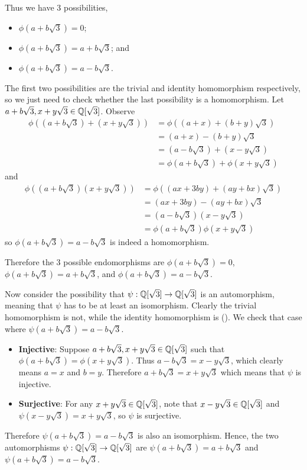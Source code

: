 \begin{questions}
    Thus we have 3 possibilities,
    \begin{itemize}
        \item $\phi(a+b\sqrt3) = 0$;
        \item $\phi(a+b\sqrt3) = a+b\sqrt3$; and
        \item $\phi(a+b\sqrt3) = a-b\sqrt3$.
    \end{itemize}
    The first two possibilities are the trivial and identity homomorphism respectively, so we just need to check whether the last possibility is a homomorphism. Let $a + b\sqrt3, x + y\sqrt3 \in \mathbb{Q}[\sqrt3]$. Observe
    \begin{align*}
        \phi((a+b\sqrt3) + (x+y\sqrt3)) &= \phi((a+x)+(b+y)\sqrt3)\\
        &= (a+x)-(b+y)\sqrt3\\
        &= (a-b\sqrt3) + (x-y\sqrt3)\\
        &= \phi(a+b\sqrt3) + \phi(x+y\sqrt3)
    \end{align*}
    and
    \begin{align*}
        \phi((a+b\sqrt3)(x+y\sqrt3)) &= \phi((ax+3by)+(ay+bx)\sqrt3)\\
        &= (ax+3by)-(ay+bx)\sqrt3\\
        &= (a-b\sqrt3)(x-y\sqrt3)\\
        &= \phi(a+b\sqrt3)\phi(x+y\sqrt3)
    \end{align*}
    so $\phi(a+b\sqrt3) = a-b\sqrt3$ is indeed a homomorphism.

    Therefore the 3 possible endomorphisms are $\phi(a+b\sqrt3) = 0$, $\phi(a+b\sqrt3) = a+b\sqrt3$, and $\phi(a+b\sqrt3) = a-b\sqrt3$.

    Now consider the possibility that $\psi: \mathbb{Q}[\sqrt3] \to \mathbb{Q}[\sqrt3]$ is an automorphism, meaning that $\psi$ has to be at least an isomorphism. Clearly the trivial homomorphism is not, while the identity homomorphism is (). We check that case where $\psi(a+b\sqrt3) = a-b\sqrt3$.
    \begin{itemize}
        \item \textbf{Injective}: Suppose $a+b\sqrt3, x+y\sqrt3 \in \mathbb{Q}[\sqrt3]$ such that $\phi(a+b\sqrt3) = \phi(x+y\sqrt3)$. Thus $a - b\sqrt3 = x - y\sqrt3$, which clearly means $a = x$ and $b = y$. Therefore $a+b\sqrt3 = x+y\sqrt3$ which means that $\psi$ is injective.
        \item \textbf{Surjective}: For any $x+y\sqrt3 \in \mathbb{Q}[\sqrt3]$, note that $x-y\sqrt3 \in \mathbb{Q}[\sqrt3]$ and $\psi(x-y\sqrt3) = x+y\sqrt3$, so $\psi$ is surjective.
    \end{itemize}
    Therefore $\psi(a+b\sqrt3) = a-b\sqrt3$ is also an isomorphism. Hence, the two automorphisms $\psi: \mathbb{Q}[\sqrt3] \to \mathbb{Q}[\sqrt3]$ are $\psi(a+b\sqrt3) = a+b\sqrt3$ and $\psi(a+b\sqrt3) = a-b\sqrt3$.


\end{questions}
